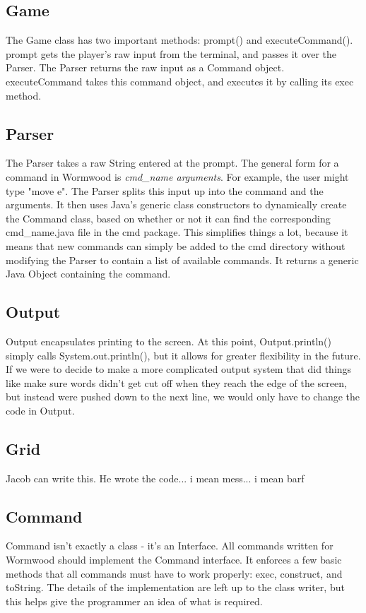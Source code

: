 \documentclass[12pt]{report}
\begin{document}
\subsection{Game}
The Game class has two important methods: prompt() and executeCommand(). prompt gets the player's raw input from the terminal, and passes it over the Parser. The Parser returns the raw input as a Command object. executeCommand takes this command object, and executes it by calling its exec method.

\subsection{Parser}
The Parser takes a raw String entered at the prompt. The general form for a command in Wormwood is \textit{cmd\_name arguments}. For example, the user might type "move e". The Parser splits this input up into the command and the arguments.  It then uses Java's generic class constructors to dynamically create the Command class, based on whether or not it can find the corresponding cmd\_name.java file in the cmd package. This simplifies things a lot, because it means that new commands can simply be added to the cmd directory without modifying the Parser to contain a list of available commands. It returns a generic Java Object containing the command. 

\subsection{Output}
Output encapsulates printing to the screen. At this point, Output.println() simply calls System.out.println(), but it allows for greater flexibility in the future. If we were to decide to make a more complicated output system that did things like make sure words didn't get cut off when they reach the edge of the screen, but instead were pushed down to the next line, we would only have to change the code in Output.

\subsection{Grid}
Jacob can write this. He wrote the code... i mean mess... i mean barf

\subsection{Command}
Command isn't exactly a class - it's an Interface. All commands written for Wormwood should implement the Command interface. It enforces a few basic methods that all commands must have to work properly: exec, construct, and toString. The details of the implementation are left up to the class writer, but this helps give the programmer an idea of what is required. 
\end{document}
